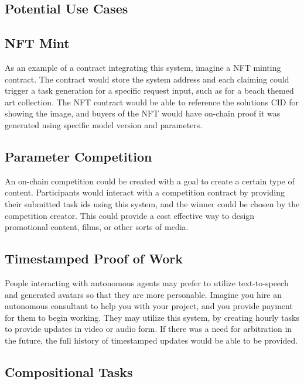 \documentclass{article}
\begin{document}
\printbibliography

\newpage

\begin{appendices}

\section{Potential Use Cases}

\subsection{NFT Mint}

As an example of a contract integrating this system, imagine a NFT minting contract. The contract would store the system address and each claiming could trigger a task generation for a specific request input, such as for a beach themed art collection. The NFT contract would be able to reference the solutions CID for showing the image, and buyers of the NFT would have on-chain proof it was generated using specific model version and parameters.

\subsection{Parameter Competition}

An on-chain competition could be created with a goal to create a certain type of content. Participants would interact with a competition contract by providing their submitted task ids using this system, and the winner could be chosen by the competition creator. This could provide a cost effective way to design promotional content, films, or other sorts of media.

\subsection{Timestamped Proof of Work}

People interacting with autonomous agents may prefer to utilize text-to-speech and generated avatars so that they are more personable. Imagine you hire an autonomous consultant to help you with your project, and you provide payment for them to begin working. They may utilize this system, by creating hourly tasks to provide updates in video or audio form. If there was a need for arbitration in the future, the full history of timestamped updates would be able to be provided.

\subsection{Compositional Tasks}


\end{appendices}
\end{document}
